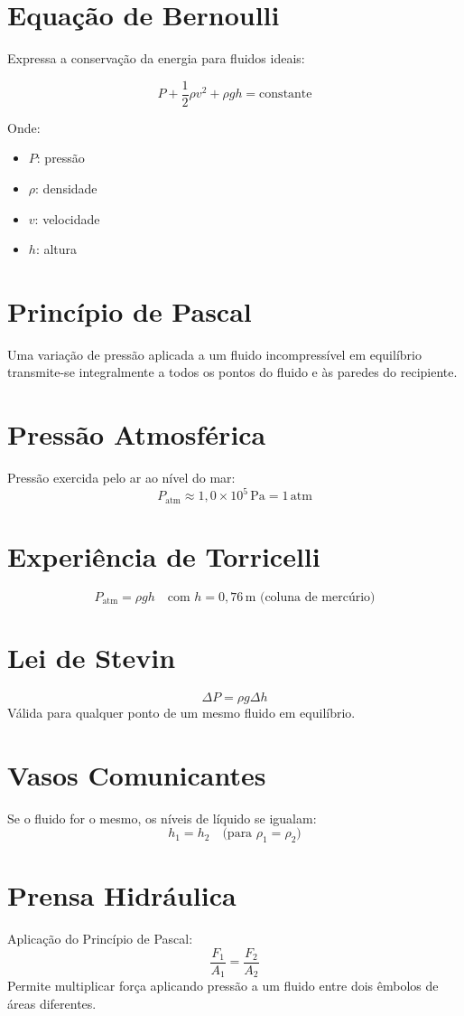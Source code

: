 \documentclass[a4paper,12pt]{article}
\begin{document}
\begin{multicols}{2}
\section{Equação de Bernoulli}

Expressa a conservação da energia para fluidos ideais:

\[
P + \frac{1}{2} \rho v^2 + \rho g h = \text{constante}
\]

Onde:
\begin{itemize}
  \item \( P \): pressão
  \item \( \rho \): densidade
  \item \( v \): velocidade
  \item \( h \): altura
\end{itemize}

\section{Princípio de Pascal}
Uma variação de pressão aplicada a um fluido incompressível em equilíbrio transmite-se integralmente a todos os pontos do fluido e às paredes do recipiente.

\section{Pressão Atmosférica}
Pressão exercida pelo ar ao nível do mar:
\[
P_{\text{atm}} \approx 1{,}0 \times 10^5\, \text{Pa} = 1\, \text{atm}
\]

\section{Experiência de Torricelli}
\[
P_{\text{atm}} = \rho g h \quad \text{com } h = 0{,}76\, \text{m (coluna de mercúrio)}
\]

\section{Lei de Stevin}
\[
\Delta P = \rho g \Delta h
\]
Válida para qualquer ponto de um mesmo fluido em equilíbrio.

\section{Vasos Comunicantes}
Se o fluido for o mesmo, os níveis de líquido se igualam:
\[
h_1 = h_2
\quad \text{(para } \rho_1 = \rho_2)
\]

\section{Prensa Hidráulica}
Aplicação do Princípio de Pascal:
\[
\frac{F_1}{A_1} = \frac{F_2}{A_2}
\]
Permite multiplicar força aplicando pressão a um fluido entre dois êmbolos de áreas diferentes.


\end{multicols}
\end{document}
